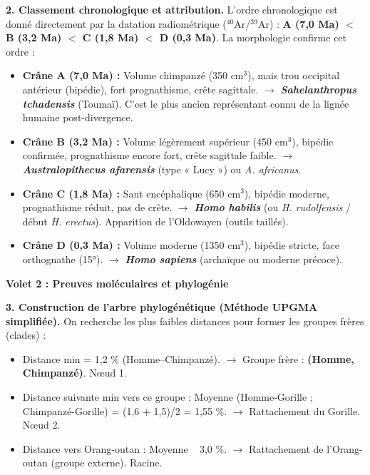 \documentclass[11pt]{article}
\begin{document}
\begin{exoresolu}
\textbf{2. Classement chronologique et attribution.}
L'ordre chronologique est donné directement par la datation radiométrique ($^{40}$Ar/$^{39}$Ar) : \textbf{A (7,0 Ma) $<$ B (3,2 Ma) $<$ C (1,8 Ma) $<$ D (0,3 Ma)}.
La morphologie confirme cet ordre :
\begin{itemize}
    \item \textbf{Crâne A (7,0 Ma) :} Volume chimpanzé (350 cm$^3$), mais trou occipital antérieur (bipédie), fort prognathisme, crête sagittale. $\rightarrow$ \textbf{\emph{Sahelanthropus tchadensis}} (Toumaï). C'est le plus ancien représentant connu de la lignée humaine post-divergence.
    \item \textbf{Crâne B (3,2 Ma) :} Volume légèrement supérieur (450 cm$^3$), bipédie confirmée, prognathisme encore fort, crête sagittale faible. $\rightarrow$ \textbf{\emph{Australopithecus afarensis}} (type « Lucy ») ou \emph{A. africanus}.
    \item \textbf{Crâne C (1,8 Ma) :} Saut encéphalique (650 cm$^3$), bipédie moderne, prognathisme réduit, pas de crête. $\rightarrow$ \textbf{\emph{Homo habilis}} (ou \emph{H. rudolfensis} / début \emph{H. erectus}). Apparition de l'Oldowayen (outils taillés).
    \item \textbf{Crâne D (0,3 Ma) :} Volume moderne (1350 cm$^3$), bipédie stricte, face orthognathe (15°). $\rightarrow$ \textbf{\emph{Homo sapiens}} (archaïque ou moderne précoce).
\end{itemize}

\textbf{Volet 2 : Preuves moléculaires et phylogénie}

\textbf{3. Construction de l'arbre phylogénétique (Méthode UPGMA simplifiée).}
On recherche les plus faibles distances pour former les groupes frères (clades) :
\begin{itemize}
    \item Distance min = 1,2 \% (Homme--Chimpanzé). $\rightarrow$ Groupe frère : \textbf{(Homme, Chimpanzé)}. Nœud 1.
    \item Distance suivante min vers ce groupe : Moyenne (Homme-Gorille ; Chimpanzé-Gorille) = (1,6 + 1,5)/2 = 1,55 \%. $\rightarrow$ Rattachement du Gorille. Nœud 2.
    \item Distance vers Orang-outan : Moyenne ~ 3,0 \%. $\rightarrow$ Rattachement de l'Orang-outan (groupe externe). Racine.
\end{itemize}

\begin{popfigure}
\begin{tikzpicture}[scale=0.9, every node/.style={font=\small}]
    

\end{tikzpicture}
\end{popfigure}
\end{exoresolu}
\end{document}

